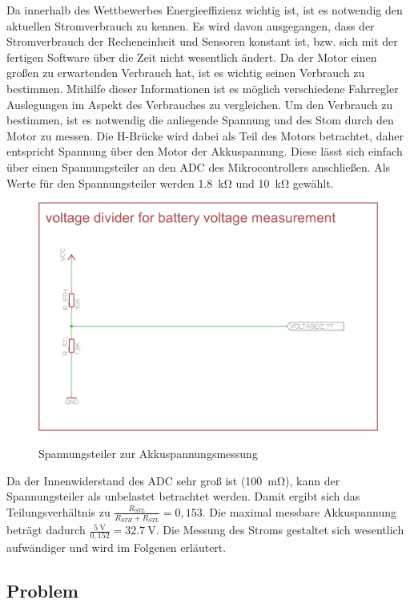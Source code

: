 Da innerhalb des Wettbewerbes Energieeffizienz wichtig ist, ist es notwendig den aktuellen Stromverbrauch zu kennen. Es wird davon ausgegangen, dass der Stromverbrauch der Recheneinheit und Sensoren
konstant ist, bzw. sich mit der fertigen Software über die Zeit nicht wesentlich ändert. Da der Motor einen großen zu erwartenden Verbrauch hat, ist es wichtig seinen Verbrauch zu bestimmen. Mithilfe dieser
Informationen ist es möglich verschiedene Fahrregler Auslegungen im Aspekt des Verbrauches zu vergleichen. Um den Verbrauch zu bestimmen, ist es notwendig die anliegende Spannung und des Stom durch den
Motor zu messen. Die H-Brücke wird dabei als Teil des Motors betrachtet, daher entspricht Spannung über den Motor der Akkuspannung. Diese lässt sich einfach über einen Spannungsteiler an den ADC des Mikrocontrollers
anschließen. Als Werte für den Spannungsteiler werden \SI{1,8}{\kohm} und \SI{10}{\kohm} gewählt.

\begin{figure}[H]
\centering
\includegraphics[width=.8\textwidth]{spannungsteiler.png}\\
\caption{Spannungsteiler zur Akkuspannungsmessung}%
\label{fig:Spannungsteiler}
\end{figure}

Da der Innenwiderstand des ADC sehr groß ist (\SI{100}{\mohm}), kann der Spannungsteiler als unbelastet betrachtet werden. Damit ergibt sich das Teilungsverhältnis zu $\frac{R_{STL}}{R_{STH}+R_{STL}}=0,153$.
Die maximal messbare Akkuspannung beträgt dadurch $\frac{\SI{5}{\V}}{0,152}=\SI{32,7}{\V}$. Die Messung des Stroms gestaltet sich wesentlich aufwändiger und wird im Folgenen erläutert.



\subsection{Problem}

